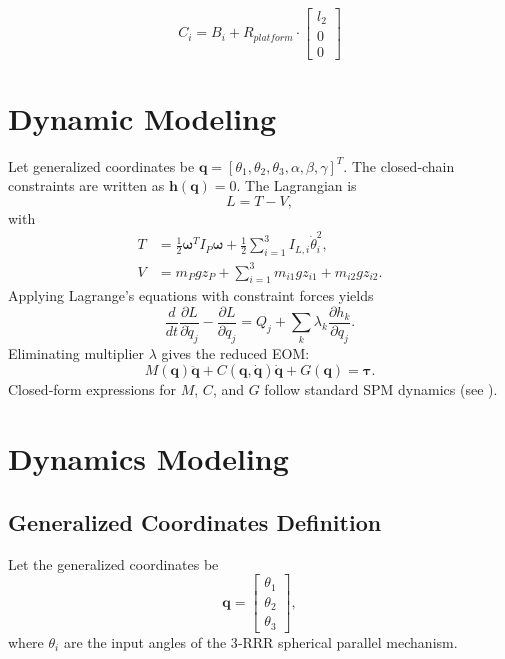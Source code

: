\documentclass[letterpaper, 10 pt, conference]{ieeeconf}  %
\begin{document}
\begin{equation}
C_i = B_i + R_{platform} \cdot
\begin{bmatrix}
l_2 \\ 0 \\ 0
\end{bmatrix}
\end{equation}\section{Dynamic Modeling}
Let generalized coordinates be
$\mathbf{q}=[\theta_1,\theta_2,\theta_3,\alpha,\beta,\gamma]^T$. The closed‑chain constraints are written as $\mathbf{h}(\mathbf{q})=0$. The Lagrangian is
\begin{equation}
L=T-V,
\end{equation}
with
\begin{subequations}
\begin{align}
T&=\tfrac12\boldsymbol{\omega}^T I_P\boldsymbol{\omega}+\tfrac12\sum_{i=1}^3 I_{L,i}\dot{\theta}_i^2,\\
V&=m_Pgz_P+\sum_{i=1}^3 m_{i1} g z_{i1}+m_{i2} g z_{i2}.
\end{align}
\end{subequations}
Applying Lagrange's equations with constraint forces yields
\begin{equation}
\frac{d}{dt}\frac{\partial L}{\partial\dot{q}_j}-\frac{\partial L}{\partial q_j}=Q_j+\sum_{k}\lambda_k\frac{\partial h_k}{\partial q_j}.
\end{equation}
Eliminating multiplier $\lambda$ gives the reduced EOM:
\begin{equation}
M(\mathbf{q})\ddot{\mathbf{q}}+C(\mathbf{q},\dot{\mathbf{q}})\dot{\mathbf{q}}+G(\mathbf{q})=\boldsymbol{\tau}.
\end{equation}
Closed‑form expressions for $M$, $C$, and $G$ follow standard SPM dynamics (see \cite{Staicu2006}).
\section{Dynamics Modeling}

\subsection{Generalized Coordinates Definition}
Let the generalized coordinates be
\[
  \mathbf{q} = \begin{bmatrix}\theta_1\\\theta_2\\\theta_3\end{bmatrix},
\]
where \(\theta_i\) are the input angles of the 3‑RRR spherical parallel mechanism.
\end{document}

